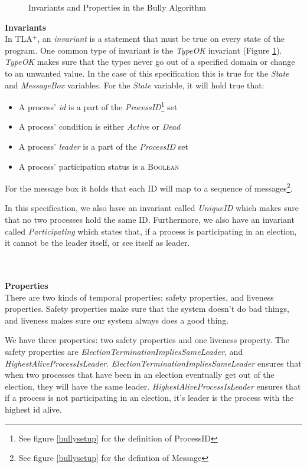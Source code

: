 \documentclass{report}
\begin{document}
\begin{calloutgreen}
\begin{calloutyellow}
\begin{figure}
  \caption{Invariants and Properties in the Bully Algorithm}
  \label{bullyinvariantsproperties}
  \end{figure}

\textbf{Invariants}\\
\noindent
In TLA$^{+}$, an \textit{invariant} is a statement that must be true on every state of the program\cite{https://learntla.com/core/invariants.html}. One common type of invariant is the \textit{TypeOK} invariant (Figure \ref{bullyinvariantsproperties}). \textit{TypeOK} makes sure that the types never go out of a specified domain or change to an unwanted value. In the case of this specification this is true for the \textit{State} and \textit{MessageBox} variables. For the \textit{State} variable, it will hold true that:
\begin{itemize}
  \item A process' \textit{id} is a part of the \textit{ProcessID}\footnote{See figure \ref{bullysetup} for the definition of ProcessID} set
  \item A process' condition is either \textit{Active} or \textit{Dead}
  \item A process' \textit{leader} is a part of the \textit{ProcessID} set
  \item A process' participation status is a \textsc{Boolean}
\end{itemize}
For the message box it holds that each ID will map to a sequence of messages\footnote{See figure \ref{bullysetup} for the defintion of Message}.

In this specification, we also have an invariant called \textit{UniqueID} which makes sure that no two processes hold the same ID. Furthermore, we also have an invariant called \textit{Participating} which states that, if a process is participating in an election, it cannot be the leader itself, or see itself as leader.

\\\\
\noindent
\textbf{Properties}\\
\noindent
There are two kinds of temporal properties: safety properties, and liveness properties. Safety properties make sure that the system doesn't do bad things, and liveness makes sure our system always does a good thing.\cite{https://learntla.com/core/temporal-logic.html}

We have three properties: two safety properties and one liveness property. The safety properties are \textit{ElectionTerminationImpliesSameLeader}, and \textit{HighestAliveProcessIsLeader}. \textit{ElectionTerminationImpliesSameLeader} ensures that when two processes that have been in an election eventually get out of the election, they will have the same leader. \textit{HighestAliveProcessIsLeader} ensures that if a process is not participating in an election, it's leader is the process with the highest id alive.


\end{calloutyellow}
\end{calloutgreen}
\end{document}
